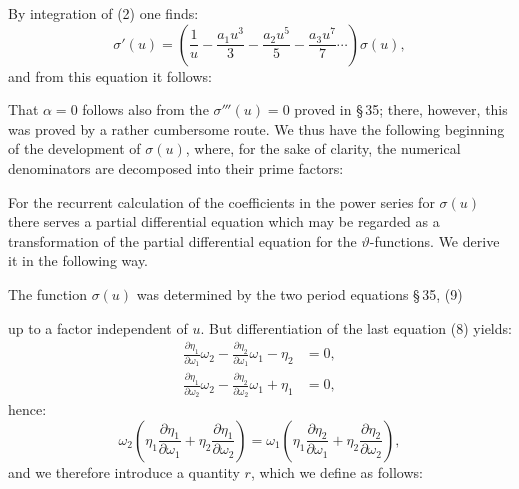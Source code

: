 
By integration of (2) one finds:
\[
\sigma'(u) = \left(\frac{1}{u} - \frac{a_1 u^3}{3} - \frac{a_2 u^5}{5} - \frac{a_3 u^7}{7}\cdots\right)\sigma(u),
\]
and from this equation it follows:


That $\alpha=0$ follows also from the $\sigma'''(u) = 0$ proved in \S\,35;
there, however, this was proved by a rather cumbersome route. We thus have
the following beginning of the development of $\sigma(u)$, where, for the
sake of clarity, the numerical denominators are decomposed into their prime
factors:


For the recurrent calculation of the coefficients in the power series for
$\sigma(u)$ there serves a partial differential equation which may be
regarded as a transformation of the partial differential equation for the
$\vartheta$-functions. We derive it in the following way.

The function $\sigma(u)$ was determined by the two period equations
\S\,35, (9)


up to a factor independent of $u$. But differentiation of the last
equation (8) yields:
\[
\begin{aligned}
\frac{\partial \eta_1}{\partial \omega_1}\omega_2 - \frac{\partial \eta_2}{\partial \omega_1}\omega_1 - \eta_2 &= 0,\\
\frac{\partial \eta_1}{\partial \omega_2}\omega_2 - \frac{\partial \eta_2}{\partial \omega_2}\omega_1 + \eta_1 &= 0,
\end{aligned}
\]
hence:
\[
\omega_2\left(\eta_1\frac{\partial \eta_1}{\partial \omega_1} + \eta_2\frac{\partial \eta_1}{\partial \omega_2}\right) = \omega_1\left(\eta_1\frac{\partial \eta_2}{\partial \omega_1} + \eta_2\frac{\partial \eta_2}{\partial \omega_2}\right),
\]
and we therefore introduce a quantity $r$, which we define as follows:

